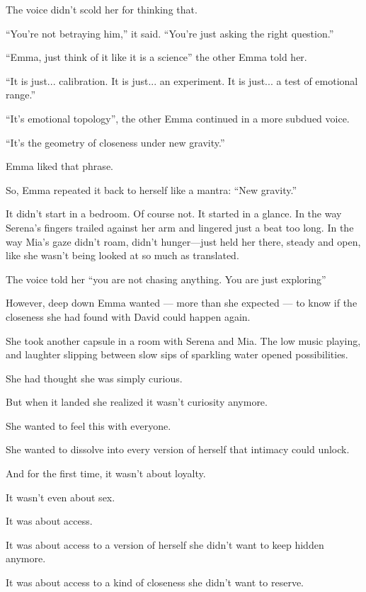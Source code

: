 The voice didn’t scold her for thinking that.

``You’re not betraying him,'' it said. ``You’re just asking the right question.''

``Emma, just think of it like it is a science'' the other Emma told her.

``It is just... calibration. It is just... an experiment. It is just... a test of emotional range.''

``It's emotional topology'', the other Emma continued in a more subdued voice.

``It's the geometry of closeness under new gravity.''

Emma liked that phrase. 

So, Emma repeated it back to herself like a mantra: ``New gravity.''

It didn’t start in a bedroom.
Of course not.
It started in a glance. In the way Serena’s fingers trailed against her arm and lingered just a beat too long.
In the way Mia’s gaze didn’t roam, didn’t hunger—just held her there, steady and open, 
like she wasn’t being looked at so much as translated.

The voice told her ``you are not chasing anything. You are just exploring''

However, deep down Emma wanted --- more than she expected --- to know 
if the closeness she had found with David could happen again.

She took another capsule in a room with Serena and Mia. The low music playing, and laughter 
slipping between slow sips of sparkling water opened possibilities.

She had thought she was simply curious.

But when it landed she realized it wasn’t curiosity anymore.

She wanted to feel this with everyone.

She wanted to dissolve into every version of herself that intimacy could unlock.

And for the first time, it wasn’t about loyalty.

It wasn’t even about sex.

It was about access.

It was about access to a version of herself she didn’t want to keep hidden anymore.

It was about access to a kind of closeness she didn’t want to reserve.
  
\medskip

